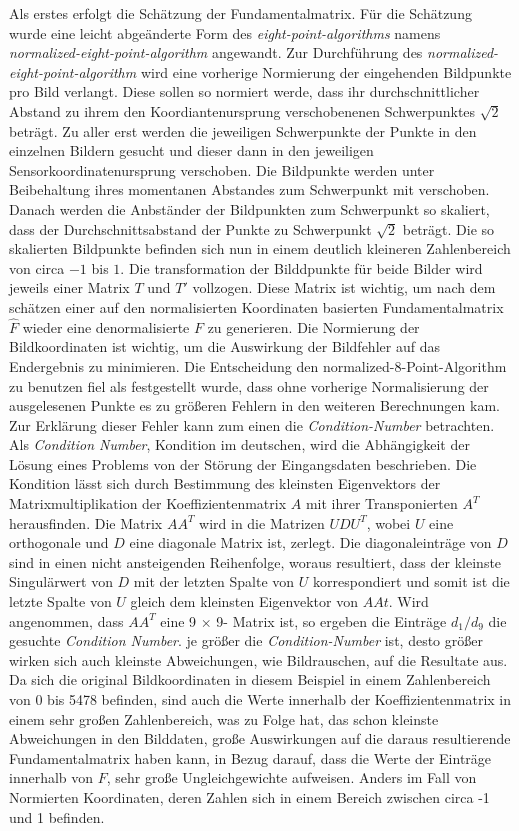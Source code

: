 Als erstes erfolgt die Schätzung der Fundamentalmatrix. Für die Schätzung wurde eine leicht abgeänderte Form des \textit{eight-point-algorithms} namens \textit{normalized-eight-point-algorithm} angewandt\cite{HZ,HZ8,Ferid}. Zur Durchführung des \textit{normalized-eight-point-algorithm} wird eine vorherige Normierung der eingehenden Bildpunkte pro Bild verlangt. Diese sollen so normiert werde, dass ihr durchschnittlicher Abstand zu ihrem den Koordiantenursprung verschobenenen Schwerpunktes $\sqrt{2}$ beträgt\cite{HZ,HZ8,Ferid}. Zu aller erst werden die jeweiligen Schwerpunkte der Punkte in den einzelnen Bildern gesucht und dieser dann in den jeweiligen Sensorkoordinatenursprung verschoben. Die Bildpunkte werden unter Beibehaltung ihres momentanen Abstandes zum Schwerpunkt mit verschoben. Danach werden die Anbständer der Bildpunkten zum Schwerpunkt so skaliert, dass der Durchschnittsabstand der Punkte zu Schwerpunkt $\sqrt{2}$ beträgt. Die so skalierten Bildpunkte befinden sich nun in einem deutlich kleineren Zahlenbereich von circa $-1$ bis $1$\cite{HZ,HZ8,Ferid}. Die transformation der Bilddpunkte für beide Bilder wird jeweils einer Matrix $T$ und $T'$ vollzogen. Diese Matrix ist wichtig, um nach dem schätzen einer auf den normalisierten Koordinaten basierten Fundamentalmatrix $\hat{F}$ wieder eine denormalisierte $F$ zu generieren. Die Normierung der Bildkoordinaten ist wichtig, um die Auswirkung der Bildfehler auf das Endergebnis zu minimieren.  Die Entscheidung den normalized-8-Point-Algorithm  zu benutzen fiel als festgestellt wurde, dass ohne vorherige Normalisierung der ausgelesenen Punkte es zu größeren Fehlern in den weiteren Berechnungen kam. Zur Erklärung dieser Fehler kann zum einen die \textit{Condition-Number} betrachten. Als \textit{Condition Number}, Kondition im deutschen, wird die Abhängigkeit der Lösung eines Problems von der Störung der Eingangsdaten beschrieben. Die Kondition lässt sich durch Bestimmung des kleinsten Eigenvektors der Matrixmultiplikation der Koeffizientenmatrix $A$ mit ihrer Transponierten $A^T$ herausfinden. Die Matrix $AA^T$ wird in die Matrizen $UDU^T$, wobei $U$ eine orthogonale und $D$ eine diagonale Matrix ist, zerlegt. Die diagonaleinträge von $D$ sind in einen nicht ansteigenden Reihenfolge, woraus resultiert, dass der kleinste Singulärwert von $D$ mit der letzten Spalte von $U$ korrespondiert und somit ist die letzte Spalte von $U$ gleich dem kleinsten Eigenvektor von $AAt$\cite{HZ8}. Wird angenommen, dass $AA^T$ eine 9 $\times$ 9- Matrix ist, so ergeben die Einträge $d_1/d_9$ die gesuchte \textit{Condition Number}. je größer die \textit{Condition-Number} ist, desto größer wirken sich auch kleinste Abweichungen, wie Bildrauschen, auf die Resultate aus. Da sich die original Bildkoordinaten in diesem Beispiel in einem Zahlenbereich von 0 bis 5478 befinden, sind auch die Werte innerhalb der Koeffizientenmatrix in einem sehr großen Zahlenbereich, was zu Folge hat, das schon kleinste Abweichungen in den Bilddaten, große Auswirkungen auf die daraus resultierende Fundamentalmatrix haben kann, in Bezug darauf, dass die Werte der Einträge innerhalb von $F$, sehr große Ungleichgewichte aufweisen. Anders im Fall von Normierten Koordinaten, deren Zahlen sich in einem Bereich zwischen circa -1 und 1 befinden.  

